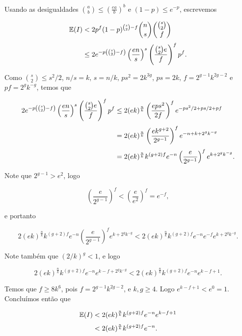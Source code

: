 Usando as desigualdades $\binom{a}{b} \leq \left(\frac{ea}{b}\right)^b$ e  $(1-p) \leq e^{-p}$, escrevemos

\begin{equation*}
\setlength{\jot}{6pt}
\begin{aligned}
\bbe(I) &< 2p^f(1-p)^{\binom{s}{2}-f}\binom{n}{s}\binom{\binom{s}{2}}{f} \\
&\leq 2e^{-p\left(\binom{s}{2}-f\right)}\left(\frac{en}{s}\right)^s\left(\frac{\binom{s}{2}e}{f}\right)^f p^f.
\end{aligned}
\end{equation*}

Como $\binom{s}{2} \leq s^2/2$, $n/s = k$, $s = n/k$, $ps^2 = 2k^{3g}$, $ps = 2k$, $f = 2^{g-1}k^{2g-2}$ e $pf = 2^g k^{-g}$, temos que

\begin{equation*}
\setlength{\jot}{6pt}
\begin{aligned}
2e^{-p\left(\binom{s}{2}-f\right)}\left(\frac{en}{s}\right)^s\left(\frac{\binom{s}{2}e}{f}\right)^f p^f &\leq 2(ek)^{\frac{n}{k}}\left(\frac{eps^2}{2f}\right)^f e^{-ps^2/2+ps/2+pf} \\
&= 2(ek)^{\frac{n}{k}} \left(\frac{ek^{g+2}}{2^{g-1}}\right)^f e^{-n+k+2^{g}k^{-g}} \\
&= 2(ek)^{\frac{n}{k}} k^{(g+2)f} e^{-n} \left(\frac{e}{2^{g-1}}\right)^f e^{k+2^g k^{-g}}.
\end{aligned}
\end{equation*}

Note que $2^{g-1} > e^2$, logo

\[\left(\frac{e}{2^{g-1}}\right)^f < \left(\frac{e}{e^2}\right)^f = e^{-f},\]

e portanto

\[2(ek)^{\frac{n}{k}} k^{(g+2)f} e^{-n} \left(\frac{e}{2^{g-1}}\right)^f e^{k+2^g k^{-g}} < 2(ek)^{\frac{n}{k}} k^{(g+2)f} e^{-n} e^{-f} e^{k+2^g k^{-g}}.\]

Note também que $(2/k)^g < 1$, e logo

\[2(ek)^{\frac{n}{k}} k^{(g+2)f} e^{-n} e^{k-f+2^g k^{-g}} < 2(ek)^{\frac{n}{k}} k^{(g+2)f} e^{-n} e^{k-f+1}.\]

Temos que $f \geq 8k^6$, pois $f = 2^{g-1}k^{2g-2}$, e $k,g \geq 4$. Logo $e^{k-f+1} < e^0 = 1$. Concluímos então que

\begin{equation*}
\setlength{\jot}{6pt}
\begin{aligned}
\bbe(I) &< 2(ek)^{\frac{n}{k}} k^{(g+2)f} e^{-n} e^{k-f+1} \\ 
&< 2(ek)^{\frac{n}{k}}k^{(g+2)f}e^{-n}.
\end{aligned}
\end{equation*}

